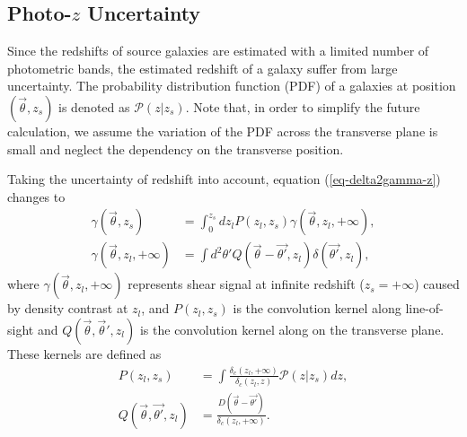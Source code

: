 \documentclass[twocolumn]{aastex62}
\newcommand{\vecb}[1]{{#1}}
\begin{document}
\subsection{Photo-$z$ Uncertainty}
Since the redshifts of source galaxies are estimated with a limited number of photometric bands, the estimated redshift of a galaxy suffer from large uncertainty. The probability distribution function (PDF) of a galaxies at position $(\vec{\theta},z_s)$ is denoted as $\mathcal{P}(z|z_s)$.  Note that, in order to simplify the future calculation, we assume the variation of the PDF across the transverse plane is small and neglect the dependency on the transverse position.

Taking the uncertainty of redshift into account, equation (\ref{eq-delta2gamma-z}) changes to
\begin{equation}\label{eq-delta2gamma-poz}
\begin{split}
\gamma(\vec{\theta},z_s) &= \int_0^{z_s} dz_l P(z_l,z_s)\gamma(\vec{\theta},z_l,+\infty),\\
\gamma(\vec{\theta},z_l,+\infty)&= \int d^2 \theta'   Q(\vec{\theta}-\vec{\theta'},z_l) \delta(\vec{\theta'},z_l),
\end{split}
\end{equation}
where $\gamma(\vec{\theta},z_l,+\infty)$ represents shear signal at infinite redshift ($z_s=+\infty$) caused by density contrast at $z_l$, and $P(z_l,z_s)$ is the convolution kernel along line-of-sight and $Q(\vec{\theta},\vec{\theta}',z_l)$ is the convolution kernel along on the transverse plane. These kernels are defined as
\begin{equation}
\begin{split}
P(z_l,z_s)&=\int \frac{\delta_c(z_l,+\infty)}{\delta_{c}(z_l,z)} \mathcal{P}(z|z_s) dz,\\
Q(\vec{\theta},\vec{\theta'},z_l)&=\frac{\vecb{D}(\vec{\theta}-\vec{\theta'})}{\delta_c(z_l,+\infty)}.
\end{split}
\end{equation}
\end{document}
